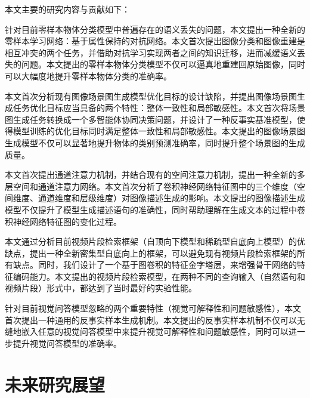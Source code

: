 本文主要的研究内容与贡献如下：
\begin{asparaenum}
\item 针对目前零样本物体分类模型中普遍存在的语义丢失的问题，本文提出一种全新的零样本学习网络：基于属性保持的对抗网络。本文首次提出图像分类和图像重建是相互冲突的两个任务，并借助对抗学习实现两者之间的知识迁移，进而减缓语义丢失的问题。本文提出的零样本物体分类模型不仅可以逼真地重建回原始图像，同时可以大幅度地提升零样本物体分类的准确率。

\item 本文首次分析现有图像场景图生成模型优化目标的设计缺陷，并提出图像场景图生成任务优化目标应当具备的两个特性：整体一致性和局部敏感性。本文首次将场景图生成任务转换成一个多智能体协同决策问题，并设计了一种反事实基准模型，使得模型训练的优化目标同时满足整体一致性和局部敏感性。本文提出的图像场景图生成模型不仅可以显著地提升物体的类别预测准确率，同时提升整个场景图的生成质量。

\item 本文首次提出通道注意力机制，并结合现有的空间注意力机制，提出一种全新的多层空间和通道注意力网络。本文首次分析了卷积神经网络特征图中的三个维度（空间维度、通道维度和层级维度）对图像描述生成的影响。本文提出的图像描述生成模型不仅提升了模型生成描述语句的准确性，同时帮助理解在生成文本的过程中卷积神经网络特征图的变化过程。

\item 本文通过分析目前视频片段检索框架（自顶向下模型和稀疏型自底向上模型）的优缺点，提出一种全新密集型自底向上的框架，可以避免现有视频片段检索框架的所有缺点。同时，我们设计了一个基于图卷积的特征金字塔层，来增强骨干网络的特征编码能力。本文提出的视频片段检索模型，在两种不同的查询输入（自然语句和视频片段）形式中，都达到了当时最好的实验性能。

\item 针对目前视觉问答模型忽略的两个重要特性（视觉可解释性和问题敏感性），本文首次提出一种通用的反事实样本生成机制。本文提出的反事实样本机制不仅可以无缝地嵌入任意的视觉问答模型中来提升视觉可解释性和问题敏感性，同时可以进一步提升视觉问答模型的准确率。

\end{asparaenum}

\section{未来研究展望}

